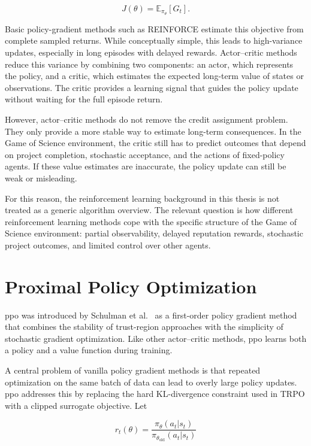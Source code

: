 \documentclass[english,bachelor]{hsluthesis}
\begin{document}
\begin{equation}
J(\theta) = \mathbb{E}_{\pi_\theta}[G_t].
\end{equation}

Basic policy-gradient methods such as REINFORCE estimate this objective from complete sampled returns. While conceptually simple, this leads to high-variance updates, especially in long episodes with delayed rewards. Actor--critic methods reduce this variance by combining two components: an actor, which represents the policy, and a critic, which estimates the expected long-term value of states or observations. The critic provides a learning signal that guides the policy update without waiting for the full episode return.

However, actor--critic methods do not remove the credit assignment problem. They only provide a more stable way to estimate long-term consequences. In the Game of Science environment, the critic still has to predict outcomes that depend on project completion, stochastic acceptance, and the actions of fixed-policy agents. If these value estimates are inaccurate, the policy update can still be weak or misleading.

For this reason, the reinforcement learning background in this thesis is not treated as a generic algorithm overview. The relevant question is how different reinforcement learning methods cope with the specific structure of the Game of Science environment: partial observability, delayed reputation rewards, stochastic project outcomes, and limited control over other agents.

\section{Proximal Policy Optimization}

\gls{ppo} was introduced by Schulman et al.~\cite{schulman2017proximalpolicyoptimizationalgorithms} as a first-order policy gradient method that combines the stability of trust-region approaches with the simplicity of stochastic gradient optimization. Like other actor--critic methods, \gls{ppo} learns both a policy and a value function during training.

A central problem of vanilla policy gradient methods is that repeated optimization on the same batch of data can lead to overly large policy updates. \gls{ppo} addresses this by replacing the hard KL-divergence constraint used in TRPO with a clipped surrogate objective. Let

\begin{equation}
r_t(\theta) =
\frac{\pi_\theta(a_t|s_t)}{\pi_{\theta_{\text{old}}}(a_t|s_t)}
\end{equation}
\end{document}
